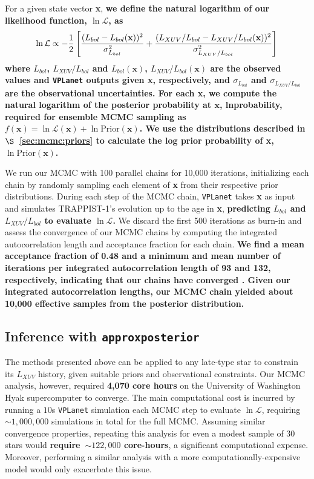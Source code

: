 \documentclass[twocolumn]{aastex62}
\newcommand{\xxx}[1]{{\textbf{#1}}}
\newcommand{\vplanet}[0]{\texttt{VPLanet}\xspace}
\newcommand{\approxposterior}[0]{\texttt{approxposterior}\xspace}
\begin{document}
For a given state vector \textbf{x}, \xxx{we define the natural logarithm of our likelihood function, $\ln \mathcal{L}$, as}
\small
\begin{equation} \label{eqn:lnlike}
    \ln \mathcal{L} \propto -\frac{1}{2} \left[ \frac{(L_{bol} - L_{bol}(\textbf{x}))^2}{\sigma_{L_{bol}}^2} + \frac{(L_{XUV}/L_{bol} - L_{XUV}/L_{bol}(\textbf{x}))^2}{\sigma_{L_{XUV}/L_{bol}}^2} \right] \\
\end{equation}
\normalsize
\xxx{where $L_{bol}$, $L_{XUV}/L_{bol}$ and $L_{bol}(\textbf{x})$, $L_{XUV}/L_{bol}(\textbf{x})$ are the observed values and \vplanet outputs given \textbf{x}, respectively, and $\sigma_{L_{bol}}$ and $\sigma_{L_{XUV}/L_{bol}}$ are the observational uncertainties. For each \textbf{x}, we compute the natural logarithm of the posterior probability at $\textbf{x}$, lnprobability, required for ensemble MCMC sampling as $f(\textbf{x}) = \ln \mathcal{L}(\textbf{x}) + \ln \mathrm{Prior}(\textbf{x})$. We use the distributions described in $\S$~\ref{sec:mcmc:priors} to calculate the log prior probability of \textbf{x}, $\ln \mathrm{Prior}(\textbf{x})$.} 

We run our MCMC with 100 parallel chains for 10,000 iterations, initializing each chain by randomly sampling each element of \textbf{x} from their respective prior distributions. During each step of the MCMC chain, \vplanet takes \textbf{x} as input and simulates TRAPPIST-1's evolution up to the age in \textbf{x}, \xxx{predicting $L_{bol}$ and $L_{XUV}/L_{bol}$ to evaluate $\ln \mathcal{L}$.} We discard the first 500 iterations as burn-in and assess the convergence of our MCMC chains by computing the integrated autocorrelation length and acceptance fraction for each chain. \xxx{We find a mean acceptance fraction of 0.48 and a minimum and mean number of iterations per integrated autocorrelation length of 93 and 132, respectively, indicating that our chains have converged \citep{ForemanMackey2013}. Given our integrated autocorrelation lengths, our MCMC chain yielded about 10,000 effective samples from the posterior distribution.}

\subsection{Inference with \approxposterior} \label{sec:methods:approx}

The methods presented above can be applied to any late-type star to constrain its $L_{XUV}$ history, given suitable priors and observational constraints. Our MCMC analysis, however, required \xxx{4,070 core hours} on the University of Washington Hyak supercomputer to converge. The main computational cost is incurred by running a $10$s \vplanet simulation each MCMC step to evaluate $\ln \mathcal{L}$, requiring ${\sim}1,000,000$ simulations in total for the full MCMC. Assuming similar convergence properties, repeating this analysis for even a modest sample of 30 stars would \xxx{require~${\sim} 122,000$ core-hours}, a significant computational expense. Moreover, performing a similar analysis with a more computationally-expensive model would only exacerbate this issue.
\end{document}

